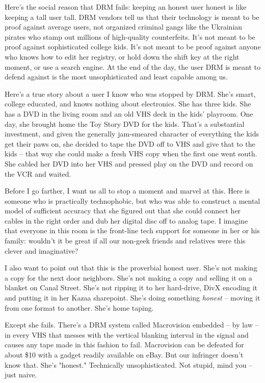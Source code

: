 Here's the social reason that DRM fails: keeping an honest user
honest is like keeping a tall user tall. DRM vendors tell us that
their technology is meant to be proof against average users, not
organized criminal gangs like the Ukrainian pirates who stamp out
millions of high-quality counterfeits. It's not meant to be proof
against sophisticated college kids. It's not meant to be proof
against anyone who knows how to edit her registry, or hold down the
shift key at the right moment, or use a search engine. At the end
of the day, the user DRM is meant to defend against is the most
unsophisticated and least capable among us.

Here's a true story about a user I know who was stopped by DRM.
She's smart, college educated, and knows nothing about electronics.
She has three kids. She has a DVD in the living room and an old VHS
deck in the kids' playroom. One day, she brought home the Toy Story
DVD for the kids. That's a substantial investment, and given the
generally jam-smeared character of everything the kids get their
paws on, she decided to tape the DVD off to VHS and give that to
the kids -- that way she could make a fresh VHS copy when the first
one went south. She cabled her DVD into her VHS and pressed play on
the DVD and record on the VCR and waited.

Before I go farther, I want us all to stop a moment and marvel at
this. Here is someone who is practically technophobic, but who was
able to construct a mental model of sufficient accuracy that she
figured out that she could connect her cables in the right order
and dub her digital disc off to analog tape. I imagine that
everyone in this room is the front-line tech support for someone in
her or his family: wouldn't it be great if all our non-geek friends
and relatives were this clever and imaginative?

I also want to point out that this is the proverbial honest user.
She's not making a copy for the next door neighbors. She's not
making a copy and selling it on a blanket on Canal Street. She's
not ripping it to her hard-drive, DivX encoding it and putting it
in her Kazaa sharepoint. She's doing something \emph{honest} --
moving it from one format to another. She's home taping.

Except she fails. There's a DRM system called Macrovision embedded
-- by law -- in every VHS that messes with the vertical blanking
interval in the signal and causes any tape made in this fashion to
fail. Macrovision can be defeated for about \$10 with a gadget
readily available on eBay. But our infringer doesn't know that.
She's "honest." Technically unsophisticated. Not stupid, mind you
-- just naive.

